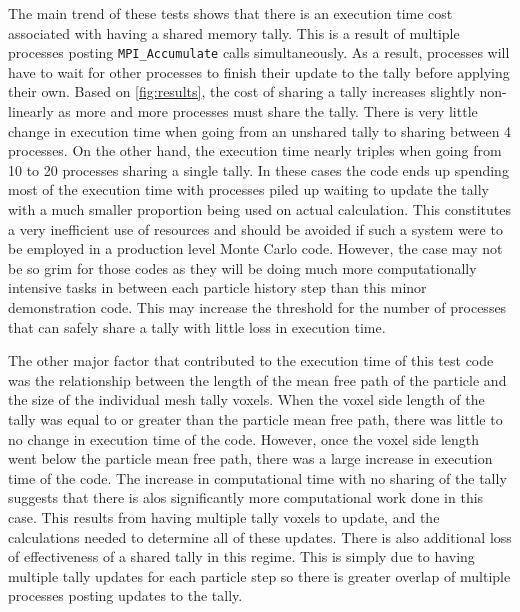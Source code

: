 \documentclass{mc2015}
\begin{document}
The main trend of these tests shows that there is an execution time cost
associated with having a shared memory tally.
This is a result of multiple processes posting
\lstinline$MPI_Accumulate$ calls simultaneously.
As a result, processes will have to wait for other processes
to finish their update to the tally before applying their own.
Based on \autoref{fig:results}, the cost of sharing a tally increases
slightly non-linearly as more and more processes must share the tally.
There is very little change in execution time when going from
an unshared tally to sharing between 4 processes.
On the other hand, the execution time nearly triples when going from
10 to 20 processes sharing a single tally.
In these cases the code ends up spending most of the execution time
with processes piled up waiting to update the tally
with a much smaller proportion being used on actual calculation.
This constitutes a very inefficient use of resources and should be avoided if such a system were to be employed in a production level Monte Carlo code.
However, the case may not be so grim for those codes as they will be doing
much more computationally intensive tasks in between each particle history step
than this minor demonstration code.
This may increase the threshold for the number of processes
that can safely share a tally with little loss in execution time.

The other major factor that contributed to the execution time of this test code
was the relationship between the length of the mean free path of the particle
and the size of the individual mesh tally voxels.
When the voxel side length of the tally was equal to or greater than
the particle mean free path, there was little to no change in execution time of the code.
However, once the voxel side length went below the particle mean free path,
there was a large increase in execution time of the code.
The increase in computational time with no sharing of the tally suggests
that there is alos significantly more computational work done in this case.
This results from having multiple tally voxels to update,
and the calculations needed to determine all of these updates.
There is also additional loss of effectiveness of a shared tally in this regime.
This is simply due to having multiple tally updates for each particle step
so there is greater overlap of multiple processes posting updates to the tally.
\end{document}
